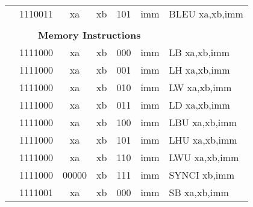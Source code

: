\begin{table}[p]
\begin{small}
\begin{center}
\begin{tabular}{rcccccccccl}
&
\multicolumn{2}{|c|}{1110011} &
\multicolumn{1}{c|}{xa} &
\multicolumn{1}{c|}{xb} &
\multicolumn{1}{c|}{101} &
\multicolumn{4}{c|}{imm} & BLEU xa,xb,imm \\
\cline{2-10}
  

&
\multicolumn{9}{c}{} & \\
&
\multicolumn{9}{c}{\bf Memory Instructions} & \\
\cline{2-10}
  

&
\multicolumn{2}{|c|}{1111000} &
\multicolumn{1}{c|}{xa} &
\multicolumn{1}{c|}{xb} &
\multicolumn{1}{c|}{000} &
\multicolumn{4}{c|}{imm} & LB xa,xb,imm \\
\cline{2-10}
  

&
\multicolumn{2}{|c|}{1111000} &
\multicolumn{1}{c|}{xa} &
\multicolumn{1}{c|}{xb} &
\multicolumn{1}{c|}{001} &
\multicolumn{4}{c|}{imm} & LH xa,xb,imm \\
\cline{2-10}
  

&
\multicolumn{2}{|c|}{1111000} &
\multicolumn{1}{c|}{xa} &
\multicolumn{1}{c|}{xb} &
\multicolumn{1}{c|}{010} &
\multicolumn{4}{c|}{imm} & LW xa,xb,imm \\
\cline{2-10}
  

&
\multicolumn{2}{|c|}{1111000} &
\multicolumn{1}{c|}{xa} &
\multicolumn{1}{c|}{xb} &
\multicolumn{1}{c|}{011} &
\multicolumn{4}{c|}{imm} & LD xa,xb,imm \\
\cline{2-10}
  

&
\multicolumn{2}{|c|}{1111000} &
\multicolumn{1}{c|}{xa} &
\multicolumn{1}{c|}{xb} &
\multicolumn{1}{c|}{100} &
\multicolumn{4}{c|}{imm} & LBU xa,xb,imm \\
\cline{2-10}
  

&
\multicolumn{2}{|c|}{1111000} &
\multicolumn{1}{c|}{xa} &
\multicolumn{1}{c|}{xb} &
\multicolumn{1}{c|}{101} &
\multicolumn{4}{c|}{imm} & LHU xa,xb,imm \\
\cline{2-10}
  

&
\multicolumn{2}{|c|}{1111000} &
\multicolumn{1}{c|}{xa} &
\multicolumn{1}{c|}{xb} &
\multicolumn{1}{c|}{110} &
\multicolumn{4}{c|}{imm} & LWU xa,xb,imm \\
\cline{2-10}
  

&
\multicolumn{2}{|c|}{1111000} &
\multicolumn{1}{c|}{00000} &
\multicolumn{1}{c|}{xb} &
\multicolumn{1}{c|}{111} &
\multicolumn{4}{c|}{imm} & SYNCI xb,imm \\
\cline{2-10}
  

&
\multicolumn{2}{|c|}{1111001} &
\multicolumn{1}{c|}{xa} &
\multicolumn{1}{c|}{xb} &
\multicolumn{1}{c|}{000} &
\multicolumn{4}{c|}{imm} & SB xa,xb,imm \\
\cline{2-10}
  


\end{tabular}
\end{center}
\end{small}
\end{table}
